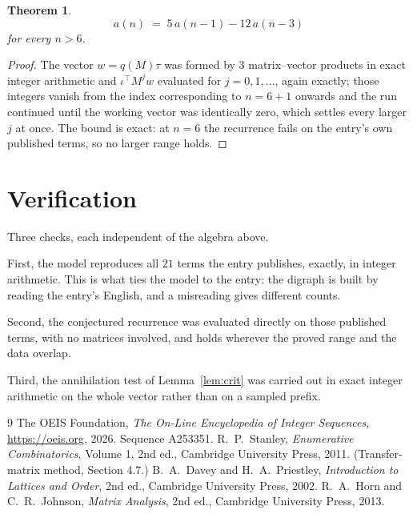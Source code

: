 \documentclass[11pt,a4paper]{article}
\theoremstyle{plain}
\newtheorem{theorem}{Theorem}
\theoremstyle{definition}
\begin{document}
\begin{theorem}
\[
a(n)\;=\;5\,a(n-1) - 12\,a(n-3)
\]
for every $n>6$.
\end{theorem}

\begin{proof}
The vector $w=q(M)\tau$ was formed by $3$ matrix--vector products in exact integer
arithmetic and $\iota^{\!\top}M^{j}w$ evaluated for $j=0,1,\dots$, again exactly; those
integers vanish from the index corresponding to $n=6+1$ onwards and the run continued
until the working vector was identically zero, which settles every larger $j$ at once. The bound is exact: at $n=6$ the recurrence fails on the entry's own published terms, so no larger range holds.
\end{proof}

\section{Verification}

Three checks, each independent of the algebra above.

First, the model reproduces all $21$ terms the entry publishes, exactly, in integer
arithmetic. This is what ties the model to the entry: the digraph is built by reading the
entry's English, and a misreading gives different counts.

Second, the conjectured recurrence was evaluated directly on those published terms, with no
matrices involved, and holds wherever the proved range and the data overlap.

Third, the annihilation test of Lemma~\ref{lem:crit} was carried out in exact integer
arithmetic on the whole vector rather than on a sampled prefix.

\begin{thebibliography}{9}
 The OEIS Foundation, \emph{The On-Line Encyclopedia of Integer
Sequences}, \url{https://oeis.org}, 2026. Sequence A253351.
 R.~P.~Stanley, \emph{Enumerative Combinatorics}, Volume 1, 2nd ed.,
Cambridge University Press, 2011. (Transfer-matrix method, Section 4.7.)
 B.~A.~Davey and H.~A.~Priestley, \emph{Introduction to Lattices and
Order}, 2nd ed., Cambridge University Press, 2002.
 R.~A.~Horn and C.~R.~Johnson, \emph{Matrix Analysis}, 2nd ed., Cambridge
University Press, 2013.
\end{thebibliography}
\end{document}
